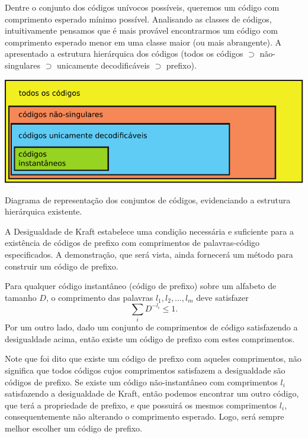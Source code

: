Dentre o conjunto dos códigos unívocos possíveis, queremos um código com
comprimento esperado mínimo possível. Analisando as classes de códigos,
intuitivamente pensamos que é mais provável encontrarmos um código com
comprimento esperado menor em uma classe maior (ou mais abrangente). 
A  apresentado a estrutura hierárquica dos códigos
(todos os códigos $\supset$ não-singulares $\supset$ unicamente decodificáveis $\supset$ prefixo).

\begin{marginfigure}%
  \includegraphics[width=\linewidth]{figures/tiposcodigos.pdf}
  \caption{Diagrama de representação dos conjuntos de códigos, evidenciando a estrutura hierárquica existente.}\label{fig:tiposcodigos}
\end{marginfigure}


A Desigualdade de Kraft estabelece uma condição necessária e suficiente para a
existência de códigos de prefixo com comprimentos de palavras-código
especificados. A demonstração, que será vista, ainda fornecerá um método para
construir um código de prefixo.

\begin{theorem}
Para qualquer código instantâneo (código de prefixo) sobre um alfabeto de tamanho $D$, o comprimento
das palavras $l_1, l_2, \ldots, l_m$ deve satisfazer
      \begin{equation}
      \sum_i D^{-l_i} \leq 1 .
      \end{equation}
Por um outro lado, dado um conjunto de comprimentos de código satisfazendo a desigualdade acima,
então existe um código de prefixo com estes comprimentos.
\end{theorem}

Note que foi dito que existe um código de prefixo com aqueles comprimentos, não
significa que todos códigos cujos comprimentos satisfazem a desigualdade são
códigos de prefixo. Se existe um código não-instantâneo com comprimentos $l_i$
satisfazendo a desigualdade de Kraft, então podemos encontrar um outro código,
que terá a propriedade de prefixo, e que possuirá os mesmos comprimentos $l_i$,
consequentemente não alterando o comprimento esperado. Logo, será sempre melhor
escolher um código de prefixo.


